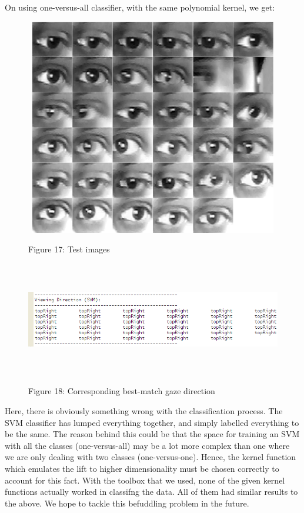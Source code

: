 \documentclass[12pt,letterpaper]{article}
\begin{document}
\newpage

On using one-versus-all classifier, with the same polynomial kernel, we get:

\begin{figure}[h]
\centering
\includegraphics[width=120mm,height=95mm]{testImg3.png}

\small Figure 17: Test images
\end{figure}

\begin{figure}[h]
\centering
\includegraphics[width=170mm,height=50mm]{viewingDir5.png}

\small Figure 18: Corresponding best-match gaze direction
\end{figure}

Here, there is obviously something wrong with the classification process. The SVM classifier has lumped
everything together, and simply labelled everything to be the same. The reason behind this could be that
the space for training an SVM with all the classes (one-versus-all) may be a lot more complex than one 
where we are only dealing with two classes (one-versus-one). Hence, the kernel function which emulates the 
lift to higher dimensionality must be chosen correctly to account for this fact. With the toolbox that we
used, none of the given kernel functions actually worked in classifng the data. All of them had similar 
results to the above. We hope to tackle this befuddling problem in the future. 
\end{document}
